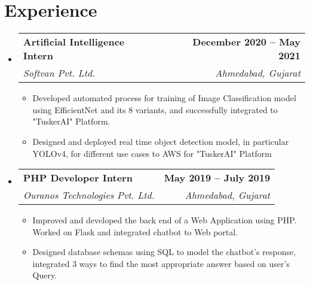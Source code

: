 \documentclass[letterpaper,11pt]{article}
\makeatletter
\newcommand{\resumeItem}[1]{
  \item\small{
    {#1 \vspace{-2pt}}
  }
}
\newcommand{\resumeSubheading}[4]{
  \vspace{-2pt}\item
    \begin{tabular*}{1.0\textwidth}[t]{l@{\extracolsep{\fill}}r}
      \textbf{#1} & \textbf{\small #2} \\
      \textit{\small#3} & \textit{\small #4} \\
    \end{tabular*}\vspace{-7pt}
}
\newcommand{\resumeSubHeadingListStart}{\begin{itemize}[leftmargin=0.0in, label={}]}
\newcommand{\resumeSubHeadingListEnd}{\end{itemize}}
\newcommand{\resumeItemListStart}{\begin{itemize}}
\newcommand{\resumeItemListEnd}{\end{itemize}\vspace{-5pt}}
\makeatother
\begin{document}
\section{Experience}
  \resumeSubHeadingListStart
    \resumeSubheading
      {Artificial Intelligence Intern}{December 2020 -- May 2021}
      {Softvan Pvt. Ltd.}{Ahmedabad, Gujarat}
      \resumeItemListStart
        \resumeItem{Developed automated process for training of Image Classification model using EfficientNet and its 8 variants, and successfully integrated to "TuskerAI" Platform.}
        \resumeItem{Designed and deployed real time object detection model, in particular YOLOv4, for different use cases to AWS for "TuskerAI" Platform}
      \resumeItemListEnd

    \resumeSubheading
      {PHP Developer Intern}{May 2019 -- July 2019}
      {Ouranos Technologies Pvt. Ltd.}{Ahmedabad, Gujarat}
      \resumeItemListStart
        \resumeItem{Improved and developed the back end of a Web Application using PHP. Worked on Flask and integrated chatbot to Web portal.}
        \resumeItem{Designed database schemas using SQL to model the chatbot's response, integrated 3 ways to find the most appropriate answer based on user's Query.}
    \resumeItemListEnd
    
  \resumeSubHeadingListEnd
\vspace{-18pt}

\end{document}
